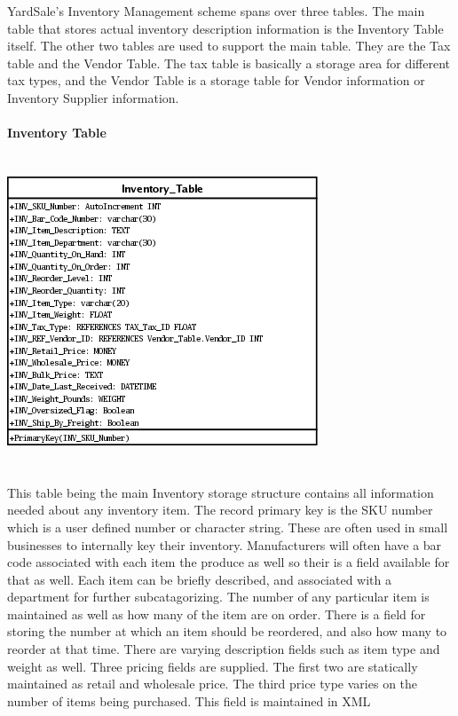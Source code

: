 \documentclass{report}
\begin{document}
	YardSale's Inventory Management scheme spans over three tables. The main table that
	stores actual inventory description information is the Inventory Table itself. The
	other two tables are used to support the main table. They are the Tax table and the
	Vendor Table. The tax table is basically a storage area for different tax types, and
	the Vendor Table is a storage table for Vendor information or Inventory Supplier
	information.\\
	\\
	{\bf Inventory Table}\\
	\\
	\\
	\includegraphics{Tables/InventoryTable.png}\\
	\\
	\\
	This table being the main Inventory storage structure contains all information needed
	about any inventory item. The record primary key is the SKU number which is a user
	defined number or character string. These are often used in small businesses to
	internally key their inventory. Manufacturers will often have a bar code associated
	with each item the produce as well so their is a field available for that as well.
	Each item can be briefly described, and associated with a department for further
	subcatagorizing. The number of any particular item is maintained as well as how many
	of the item are on order. There is a field for storing the number at which an item should
	be reordered, and also how many to reorder at that time. There are varying description
	fields such as item type and weight as well. Three pricing fields are supplied. The
	first two are statically maintained as retail and wholesale price. The third price
	type varies on the number of items being purchased. This field is maintained in XML
\end{document}
